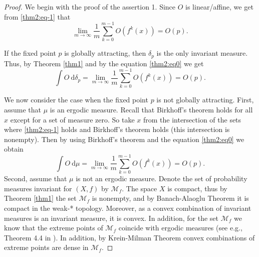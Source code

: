 \documentclass[format=acmsmall, authorversion, screen=true]{acmart}
\def\dmu{\mathrm{d}\mu}
\def\dd{\mathrm{d}\delta}
\begin{document}
\begin{proof}
We begin with the proof of the assertion 1.
Since $O$ is linear/affine, we get from \eqref{thm2:eq-1} that
\begin{equation}\label{thm2:eq0}
 \lim\limits_{m \to \infty} \frac{1}{m} \sum_{k=0}^{m-1} O(f^k(x)) = O(p).
\end{equation}

If the fixed point $p$ is globally attracting, then $\delta_p$ is the only invariant measure. Thus, by Theorem \ref{thm1} and by the equation \eqref{thm2:eq0} we get
\[
 \int O\: \dd_p = \lim\limits_{m \to \infty} \frac{1}{m} \sum_{k=0}^{m-1} O(f^k(x)) = O(p).
\]

We now consider the case when the fixed point $p$ is not globally attracting. First, assume that $\mu$ is an ergodic measure.
Recall that Birkhoff's theorem holds for all $x$ except for a set of measure zero. So take $x$ from the intersection of the sets where \eqref{thm2:eq-1} holds and Birkhoff's theorem holds (this intersection is nonempty). Then by using Birkhoff's theorem and the equation \eqref{thm2:eq0} we obtain
\begin{equation}\label{thm2:eq1}
 \int O\: \dmu = \lim\limits_{m \to \infty} \frac{1}{m} \sum_{k=0}^{m-1} O(f^k(x)) = O(p).
\end{equation}
Second, assume that $\mu$ is not an ergodic measure. Denote the set of probability measures invariant for $(X,f)$ by $\mathcal{M}_f$. 
The space $X$ is compact, thus  by Theorem \ref{thm1} the set $\mathcal{M}_f$ is nonempty, and by Banach-Alaoglu Theorem it is compact in the weak-* topology. Moreover, as a convex combination of invariant measures is an invariant measure, it is convex.
In addition, for the set $\mathcal{M}_f$ we know that the extreme points of $\mathcal{M}_f$ coincide with ergodic measures (see e.g., Theorem 4.4 in \cite{EWbook2011}).
In addition, by Krein-Milman Theorem convex combinations of extreme points are dense in $\mathcal{M}_f$.


\end{proof}
\end{document}
